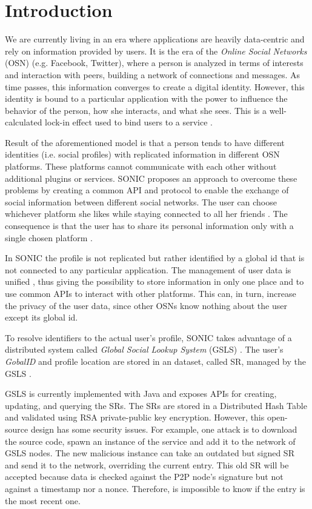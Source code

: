 \section{Introduction}
\label{S:1}

We are currently living in an era where applications are heavily data-centric and rely on information provided by users. It is the era of the \textit{Online Social Networks} (OSN) \cite{gondor_sonic:_2014} (e.g. Facebook, Twitter), where a person is analyzed in terms of interests and interaction with peers, building a network of connections and messages. As time passes, this information converges to create a digital identity. However, this identity is bound to a particular application with the power to influence the behavior of the person, how she interacts, and what she sees. This is a well-calculated lock-in effect used to bind users to a service \cite{gondor_distributed_2016}. 

Result of the aforementioned model is that a person tends to have different identities (i.e. social profiles) with replicated information in different OSN platforms. These platforms cannot communicate with each other without additional plugins or services. SONIC \cite{gondor_sonic:_2014} proposes an approach to overcome these problems by creating a common API and protocol to enable the exchange of social information between different social networks. The user can choose whichever platform she likes while staying connected to all her friends \cite{gondor_distributed_2016}. The consequence is that the user has to share its personal information only with a single chosen platform \cite{gondor_sonic:_2014}. 

In SONIC the profile is not replicated but rather identified by a global id that is not connected to any particular application. The management of user data is unified \cite{identity_mgmt_2003}, thus giving the possibility to store information in only one place and to use common APIs to interact with other platforms. This can, in turn, increase the privacy of the user data, since other OSNs know nothing about the user except its global id.

To resolve identifiers to the actual user's profile, SONIC takes advantage of a distributed system called \textit{Global Social Lookup System} (GSLS) \cite{gondor_distributed_2016}. The user's \textit{GobalID} and profile location are stored in an dataset, called SR, managed by the GSLS \cite{gondor_distributed_2016}.

GSLS is currently implemented with Java and exposes APIs for creating, updating, and querying the SRs. The SRs are stored in a Distributed Hash Table \cite{tomp2p_2009} and validated using RSA private-public key encryption. However, this open-source design has some security issues. For example, one attack is to download the source code, spawn an instance of the service and add it to the network of GSLS nodes. The new malicious instance can take an outdated but signed SR and send it to the network, overriding the current entry. This old SR will be accepted because data is checked against the P2P node's signature but not against a timestamp nor a nonce. Therefore, is impossible to know if the entry is the most recent one. 

